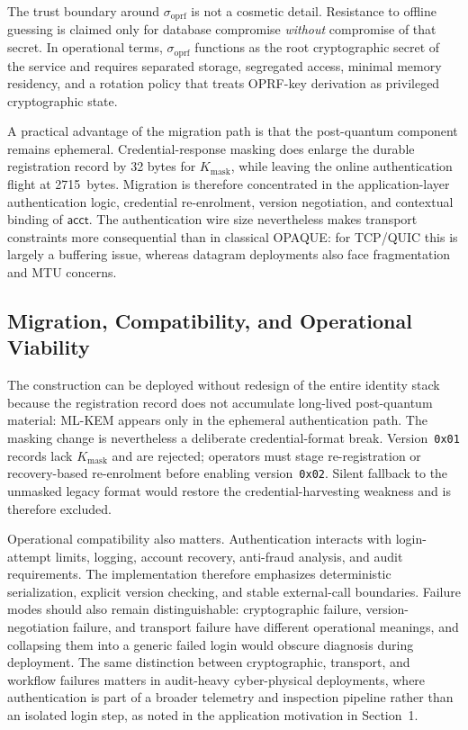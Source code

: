 \documentclass[preprint,12pt]{elsarticle}
\newcommand{\acct}{\mathsf{acct}}
\newcommand{\sigoprf}{\sigma_{\mathrm{oprf}}}
\theoremstyle{remark}
\begin{document}
The trust boundary around $\sigoprf$ is not a cosmetic detail. Resistance
to offline guessing is claimed only for database compromise
\emph{without} compromise of that secret. In operational terms,
$\sigoprf$ functions as the root cryptographic secret of the service and
requires separated storage, segregated access, minimal memory residency,
and a rotation policy that treats OPRF-key derivation as privileged
cryptographic state.

A practical advantage of the migration path is that the
post-quantum component remains ephemeral. Credential-response masking does
enlarge the durable registration record by 32 bytes for $K_{\mathrm{mask}}$,
while leaving the online authentication flight at 2715~bytes. Migration is
therefore concentrated in the application-layer authentication logic,
credential re-enrolment, version negotiation, and contextual binding of
$\acct$. The authentication wire size nevertheless makes
transport constraints more consequential than in classical OPAQUE: for
TCP/QUIC this is largely a buffering issue, whereas datagram
deployments also face fragmentation and MTU concerns.

\subsection{Migration, Compatibility, and Operational Viability}

The construction can be deployed without redesign of the entire identity
stack because the registration record does not accumulate long-lived
post-quantum material: ML-KEM appears only in the ephemeral authentication
path. The masking change is nevertheless a deliberate credential-format
break. Version~\texttt{0x01} records lack $K_{\mathrm{mask}}$ and are rejected;
operators must stage re-registration or recovery-based re-enrolment before
enabling version~\texttt{0x02}. Silent fallback to the unmasked legacy format
would restore the credential-harvesting weakness and is therefore excluded.

Operational compatibility also matters.
Authentication interacts with login-attempt limits, logging, account
recovery, anti-fraud analysis, and audit requirements. The
implementation therefore emphasizes deterministic serialization,
explicit version checking, and stable external-call boundaries. Failure modes
should also remain distinguishable: cryptographic failure,
version-negotiation failure, and transport failure have different
operational meanings, and collapsing them into a generic failed login
would obscure diagnosis during deployment.
The same distinction between cryptographic, transport, and workflow
failures matters in audit-heavy cyber-physical deployments, where
authentication is part of a broader telemetry and inspection pipeline
rather than an isolated login step, as noted in the application
motivation in Section~1.
\end{document}

